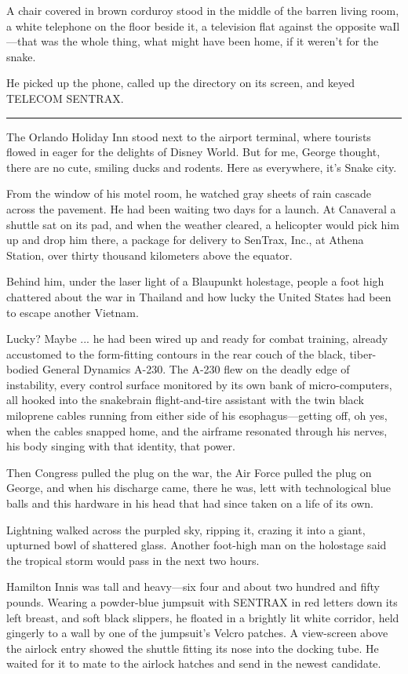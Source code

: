 A chair covered in brown corduroy stood in the middle of the barren living room, a white telephone on the floor beside it, a television flat against the opposite waIl—that was the whole thing, what might have been home, if it weren't for the snake.

He picked up the phone, called up the directory on its screen, and keyed TELECOM SENTRAX.

\fancybreak{* * *}

The Orlando Holiday Inn stood next to the airport terminal, where tourists flowed in eager for the delights of Disney World. But for me, George thought, there are no cute, smiling ducks and rodents. Here as everywhere, it's Snake city.

From the window of his motel room, he watched gray sheets of rain cascade across the pavement. He had been waiting two days for a launch. At Canaveral a shuttle sat on its pad, and when the weather cleared, a helicopter would pick him up and drop him there, a package for delivery to SenTrax, Inc., at Athena Station, over thirty thousand kilometers above the equator.

Behind him, under the laser light of a Blaupunkt holestage, people a foot high chattered about the war in Thailand and how lucky the United States had been to escape another Vietnam.

Lucky? Maybe ... he had been wired up and ready for combat training, already accustomed to the form-fitting contours in the rear couch of the black, tiber-bodied General Dynamics A-230. The A-230 flew on the deadly edge of instability, every control surface monitored by its own bank of micro-computers, all hooked into the snakebrain flight-and-tire assistant with the twin black miloprene cables running from either side of his esophagus—getting off, oh yes, when the cables snapped home, and the airframe resonated through his nerves, his body singing with that identity, that power.

Then Congress pulled the plug on the war, the Air Force pulled the plug on George, and when his discharge came, there he was, lett with technological blue balls and this hardware in his head that had since taken on a life of its own.

Lightning walked across the purpled sky, ripping it, crazing it into a giant, upturned bowl of shattered glass. Another foot-high man on the holostage said the tropical storm would pass in the next two hours.

Hamilton Innis was tall and heavy—six four and about two hundred and fifty pounds. Wearing a powder-blue jumpsuit with SENTRAX in red letters down its left breast, and soft black slippers, he floated in a brightly lit white corridor, held gingerly to a wall by one of the jumpsuit's Velcro patches. A view-screen above the airlock entry showed the shuttle fitting its nose into the docking tube. He waited for it to mate to the airlock hatches and send in the newest candidate.


